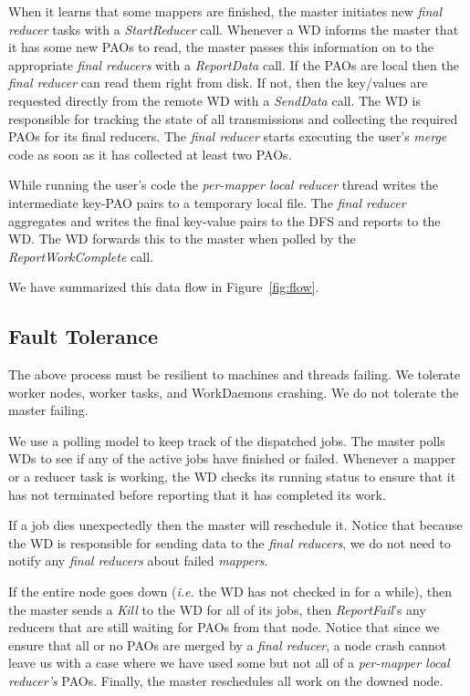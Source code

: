\documentclass[10pt,letter,final,article,twocolumn]{article} %
\newcommand{\rpc}[1]{\emph{#1}}
\begin{document}
When it learns that some mappers are finished, the master initiates new \emph{final reducer} tasks with a \rpc{StartReducer} call. Whenever a WD informs the master that it has some new PAOs to read, the master passes this information on to the appropriate \emph{final reducers} with a \rpc{ReportData} call. If the PAOs  are local then the \emph{final reducer} can read them right from disk. If not, then the key/values are requested directly from the remote WD with a \rpc{SendData} call. The WD is responsible for tracking the state of all transmissions and collecting the required PAOs for its final reducers. The \emph{final reducer} starts executing the user's \emph{merge} code as soon as it has collected at least two PAOs.

While running the user's code the \emph{per-mapper local reducer} thread writes the intermediate key-PAO pairs to a temporary local file. The \emph{final reducer} aggregates and writes the final key-value pairs to the DFS and reports to the WD. The WD forwards this to the master when polled by the \rpc{ReportWorkComplete} call.

We have summarized this data flow in Figure~\ref{fig:flow}.

\subsection{Fault Tolerance}
The above process must be resilient to machines and threads failing. We tolerate worker nodes, worker tasks, and WorkDaemons crashing. We do not tolerate the master failing.

We use a polling model to keep track of the dispatched jobs. The master polls WDs to see if any of the active jobs have finished or failed. Whenever a mapper or a reducer task is working, the WD checks its running status to ensure that it has not terminated before reporting that it has completed its work.

If a job dies unexpectedly then the master will reschedule it. Notice that because the WD is responsible for sending data to the \emph{final reducers}, we do not need to notify any \emph{final reducers} about failed \emph{mappers}. 

If the entire node goes down (\textit{i.e.} the WD has not checked in for a while), then the master sends a \rpc{Kill} to the WD for all of its jobs, then \rpc{ReportFail}'s any reducers that are still waiting for PAOs from that node. Notice that since we ensure that all or no PAOs are merged by a \emph{final reducer}, a node crash cannot leave us with a case where we have used some but not all of a \emph{per-mapper local reducer's} PAOs. Finally, the master reschedules all work on the downed node.
\end{document}
